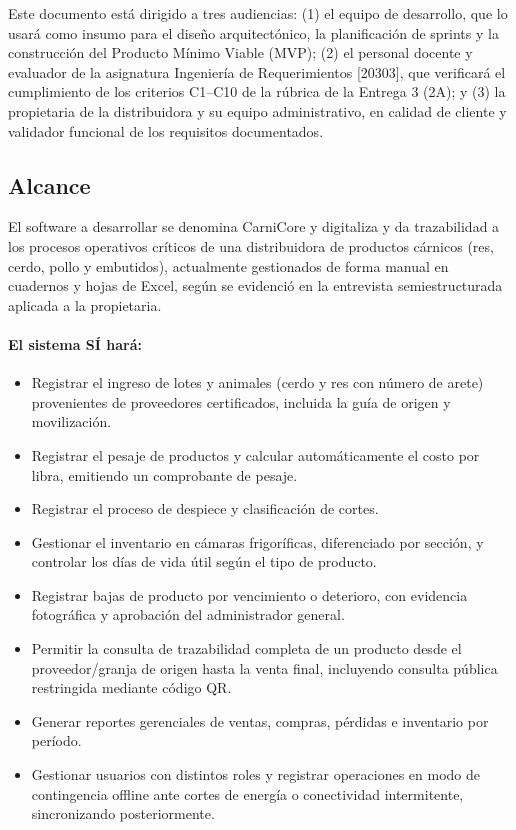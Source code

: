 \documentclass[11pt,a4paper]{article}
\begin{document}
Este documento está dirigido a tres audiencias: (1) el equipo de desarrollo, que lo usará como insumo para el diseño arquitectónico, la planificación de sprints y la construcción del Producto Mínimo Viable (MVP); (2) el personal docente y evaluador de la asignatura Ingeniería de Requerimientos [20303], que verificará el cumplimiento de los criterios C1--C10 de la rúbrica de la Entrega 3 (2A); y (3) la propietaria de la distribuidora y su equipo administrativo, en calidad de cliente y validador funcional de los requisitos documentados.

\subsection{Alcance}
El software a desarrollar se denomina CarniCore y digitaliza y da trazabilidad a los procesos operativos críticos de una distribuidora de productos cárnicos (res, cerdo, pollo y embutidos), actualmente gestionados de forma manual en cuadernos y hojas de Excel, según se evidenció en la entrevista semiestructurada aplicada a la propietaria.

\paragraph{El sistema SÍ hará:}
\begin{itemize}[nosep]
\item Registrar el ingreso de lotes y animales (cerdo y res con número de arete) provenientes de proveedores certificados, incluida la guía de origen y movilización.
\item Registrar el pesaje de productos y calcular automáticamente el costo por libra, emitiendo un comprobante de pesaje.
\item Registrar el proceso de despiece y clasificación de cortes.
\item Gestionar el inventario en cámaras frigoríficas, diferenciado por sección, y controlar los días de vida útil según el tipo de producto.
\item Registrar bajas de producto por vencimiento o deterioro, con evidencia fotográfica y aprobación del administrador general.
\item Permitir la consulta de trazabilidad completa de un producto desde el proveedor/granja de origen hasta la venta final, incluyendo consulta pública restringida mediante código QR.
\item Generar reportes gerenciales de ventas, compras, pérdidas e inventario por período.
\item Gestionar usuarios con distintos roles y registrar operaciones en modo de contingencia offline ante cortes de energía o conectividad intermitente, sincronizando posteriormente.
\end{itemize}
\end{document}
